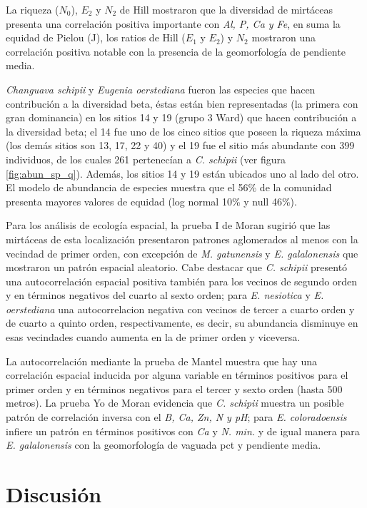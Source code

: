 \documentclass[11pt,]{article}
\begin{document}
La riqueza (\(N_0\)), \(E_2\) y \(N_2\) de Hill mostraron que la
diversidad de mirtáceas presenta una correlación positiva importante con
\emph{Al, P, Ca y Fe}, en suma la equidad de Pielou (J), los ratios de
Hill (\(E_1\) y \(E_2\)) y \(N_2\) mostraron una correlación positiva
notable con la presencia de la geomorfología de pendiente media.

\emph{Changuava schipii} y \emph{Eugenia oerstediana} fueron las
especies que hacen contribución a la diversidad beta, éstas están bien
representadas (la primera con gran dominancia) en los sitios 14 y 19
(grupo 3 Ward) que hacen contribución a la diversidad beta; el 14 fue
uno de los cinco sitios que poseen la riqueza máxima (los demás sitios
son 13, 17, 22 y 40) y el 19 fue el sitio más abundante con 399
individuos, de los cuales 261 pertenecían a \emph{C. schipii} (ver
figura \ref{fig:abun_sp_q}). Además, los sitios 14 y 19 están ubicados
uno al lado del otro. El modelo de abundancia de especies muestra que el
56\% de la comunidad presenta mayores valores de equidad (log normal
10\% y null 46\%).

Para los análisis de ecología espacial, la prueba I de Moran sugirió que
las mirtáceas de esta localización presentaron patrones aglomerados al
menos con la vecindad de primer orden, con excepción de \emph{M.
gatunensis} y \emph{E. galalonensis} que mostraron un patrón espacial
aleatorio. Cabe destacar que \emph{C. schipii} presentó una
autocorrelación espacial positiva también para los vecinos de segundo
orden y en términos negativos del cuarto al sexto orden; para \emph{E.
nesiotica} y \emph{E. oerstediana} una autocorrelacion negativa con
vecinos de tercer a cuarto orden y de cuarto a quinto orden,
respectivamente, es decir, su abundancia disminuye en esas vecindades
cuando aumenta en la de primer orden y viceversa.

La autocorrelación mediante la prueba de Mantel muestra que hay una
correlación espacial inducida por alguna variable en términos positivos
para el primer orden y en términos negativos para el tercer y sexto
orden (hasta 500 metros). La prueba Yo de Moran evidencia que \emph{C.
schipii} muestra un posible patrón de correlación inversa con el
\emph{B, Ca, Zn, N y pH}; para \emph{E. coloradoensis} infiere un patrón
en términos positivos con \emph{Ca} y \emph{N. min.} y de igual manera
para \emph{E. galalonensis} con la geomorfología de vaguada pct y
pendiente media.

\section{Discusión}\label{discusiuxf3n}
\end{document}
